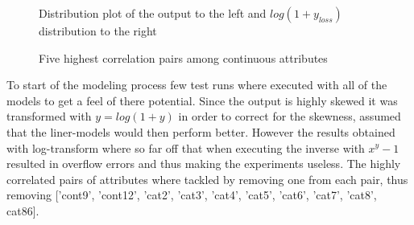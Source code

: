 \documentclass[a4paper]{article}
\begin{document}
\begin{figure}[H]
\centering
{}
\caption{Distribution plot of the output to the left and $log(1 + y_{loss})$ distribution to the right}
\label{fig:loss}
\end{figure}
\begin{figure}[H]
\centering
{}
\caption{Five highest correlation pairs among continuous attributes}
\label{fig:con-corr}
\end{figure}
To start of the modeling process few test runs where executed with all of the models to get a feel of there potential. Since the output is highly skewed it was transformed with $y=log(1 + y)$ in order to correct for the skewness, assumed that the liner-models would then perform better. However the results obtained with log-transform where so far off that when executing the inverse with $x^y - 1$ resulted in overflow errors and thus making the experiments useless.
The highly correlated pairs of attributes where tackled by removing one from each pair, thus removing ['cont9', 'cont12', 'cat2', 'cat3', 'cat4', 'cat5', 'cat6', 'cat7', 'cat8', cat86].
\end{document}
